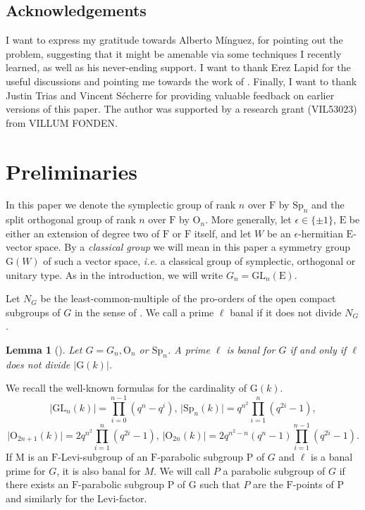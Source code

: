 \documentclass[10pt,a4paper]{article}
\newtheorem{lemma}{Lemma}
\theoremstyle{remark}
\theoremstyle{definition}
\newcommand{\FF}{\mathrm{F}}
\newcommand{\mG}{\mathrm{G}   }
\newcommand{\mM}{\mathrm{M}}
\newcommand{\mP}{\mathrm{P}}
\newcommand{\Sp}{\mathrm{Sp}}
\newcommand{\Oo}{\mathrm{O}}
\newcommand{\EE}{\mathrm{E}}
\begin{document}
\subsection*{Acknowledgements}
I want to express my gratitude towards Alberto Mínguez, for pointing out the problem, suggesting that it might be amenable via some techniques I recently learned, as well as his never-ending support. I  want to thank Erez Lapid for the useful discussions and pointing me towards the work of \cite{Heiermann2011}. Finally, I want to thank Justin Trias and Vincent Sécherre for providing valuable feedback on earlier versions of this paper.
The author was supported by a research grant (VIL53023) from VILLUM FONDEN.
\section{Preliminaries}
 In this paper we denote the symplectic group of rank $n$ over $\FF$ by $\Sp_n$ and the split orthogonal group of rank $n$ over $\FF$ by $\Oo_n$. 
 More generally, let $\epsilon\in\{\pm 1\}$, $\EE$ be either an extension of degree two of $\FF$ or $\FF$ itself, and let $W$ be an $\epsilon$-hermitian $\EE$-vector space. By a \emph{classical group} we will mean in this paper a symmetry group $\mG(W)$ of such a vector space, \emph{i.e.} a classical group of symplectic, orthogonal or unitary type. As in the introduction, we will write $G_n=\mathrm{GL}_n(\EE).$
 
 Let $N_G$ be the least-common-multiple of the pro-orders of the open compact subgroups of $G$ in the sense of \cite{Vig96}. We call a prime $\ell$ banal if it does not divide $N_G$.
\begin{lemma}[{\cite[Lemma 5.22]{Dat_Helm_Kurinczuk_Moss_2025}}]\label{L:banalcrit}
    Let $G=G_n,\Oo_n$ or $\Sp_n$.
    A prime $\ell$ is banal for $G$ if and only if $\ell$ does not divide  $\lvert \mG(k)\lvert$.
\end{lemma} 
We recall the well-known formulas for the cardinality of $\mG(k)$.
\[\lvert\mathrm{GL}_n(k)\rvert=\prod_{i=0}^{n-1}(q^n-q^i),\,\lvert\Sp_n(k)\rvert=q^{n^2}\prod_{i=1}^n(q^{2i}-1),\]\[ \lvert\Oo_{2n+1}(k)\rvert=2q^{n^2}\prod_{i=1}^n(q^{2i}-1),\,\lvert\Oo_{2n}(k)\rvert=2q^{n^2-n}(q^n-1)\prod_{i=1}^{n-1}(q^{2i}-1).\]
If $\mM$ is an $\FF$-Levi-subgroup of an $\FF$-parabolic subgroup $\mP$ of $G$ and $\ell$ is a banal prime for $G$, it is also banal for $M$.
We will call $P$ a parabolic subgroup of $G$ if there exists an $\FF$-parabolic subgroup $\mP$ of $\mG$ such that $P$ are the $\FF$-points of $\mP$ and similarly for the Levi-factor.
\end{document}
